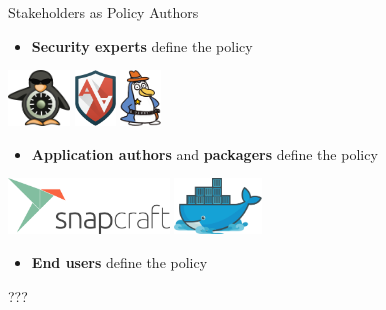 \documentclass[12pt, dvipsnames]{beamer}
\begin{document}
\begin{frame}[c]{Stakeholders as Policy Authors}
\begin{itemize}
    \item \textbf{Security experts} define the policy
\end{itemize}
\begin{center}
    \includegraphics[height=4em]{figs/selinux.png}
    \hspace{3em}
    \includegraphics[height=4em]{figs/apparmor.png}
    \hspace{3em}
    \includegraphics[height=4em]{figs/tomoyo.png}
\end{center}

\begin{itemize}
    \item \textbf{Application authors} and \textbf{packagers} define the policy
\end{itemize}
\begin{center}
    \includegraphics[height=4em]{figs/Snapcraft.png}
    \hspace{3em}
    \includegraphics[height=4em]{figs/docker.png}
\end{center}

\begin{itemize}
    \item \textbf{End users} define the policy
\end{itemize}
\begin{center}
    \Huge ???
\end{center}
\end{frame}
\end{document}
